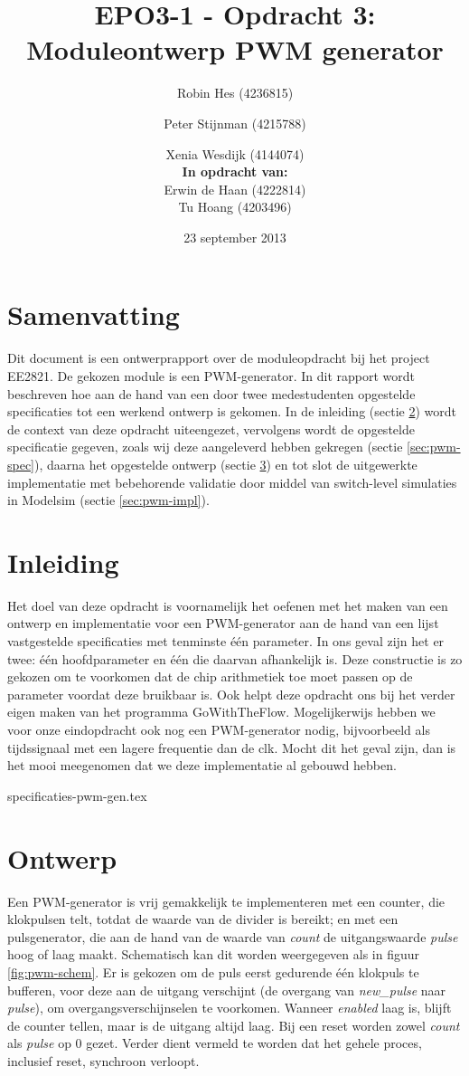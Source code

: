 \documentclass{article}
\author{
Robin Hes (4236815) \and Peter Stijnman (4215788) \and Xenia Wesdijk (4144074) \\

\textbf{In opdracht van:} \\
Erwin de Haan (4222814) \\
Tu Hoang (4203496) \\
}
\title{EPO3-1 - Opdracht 3: Moduleontwerp PWM generator}
\date{23 september 2013}
\begin{document}
\maketitle
\section{Samenvatting}
Dit document is een ontwerprapport over de moduleopdracht bij het project EE2821. De gekozen module is een PWM-generator.
In dit rapport wordt beschreven hoe aan de hand van een door twee medestudenten opgestelde specificaties tot een werkend ontwerp is gekomen.
In de inleiding (sectie \ref{sec:pwm-inl}) wordt de context van deze opdracht uiteengezet, vervolgens wordt de opgestelde specificatie gegeven, zoals wij deze aangeleverd hebben gekregen (sectie \ref{sec:pwm-spec}), daarna het opgestelde ontwerp (sectie \ref{sec:pwm-ontw}) en tot slot de uitgewerkte implementatie met bebehorende validatie door middel van switch-level simulaties in Modelsim (sectie \ref{sec:pwm-impl}).

\tableofcontents

\section{Inleiding}
\label{sec:pwm-inl}
Het doel van deze opdracht is voornamelijk het oefenen met het maken van een ontwerp en implementatie voor een PWM-generator aan de hand van een lijst vastgestelde specificaties met tenminste één parameter. In ons geval zijn het er twee: één hoofdparameter en één die daarvan afhankelijk is. Deze constructie is zo gekozen om te voorkomen dat de chip arithmetiek toe moet passen op de parameter voordat deze bruikbaar is. Ook helpt deze opdracht ons bij het verder eigen maken van het programma GoWithTheFlow.
Mogelijkerwijs hebben we voor onze eindopdracht ook nog een PWM-generator nodig, bijvoorbeeld als tijdssignaal met een lagere frequentie dan de clk. Mocht dit het geval zijn, dan is het mooi meegenomen dat we deze implementatie al gebouwd hebben.

{specificaties-pwm-gen.tex}

\section{Ontwerp}
\label{sec:pwm-ontw}
Een PWM-generator is vrij gemakkelijk te implementeren met een counter, die klokpulsen telt, totdat de waarde van de divider is bereikt; en met een pulsgenerator, die aan de hand van de waarde van \textit{count} de uitgangswaarde \textit{pulse} hoog of laag maakt.
Schematisch kan dit worden weergegeven als in figuur \ref{fig:pwm-schem}. Er is gekozen om de puls eerst gedurende één klokpuls te bufferen, voor deze aan de uitgang verschijnt (de overgang van \textit{new\_pulse} naar \textit{pulse}), om overgangsverschijnselen te voorkomen. Wanneer \textit{enabled} laag is, blijft de counter tellen, maar is de uitgang altijd laag. Bij een reset worden zowel \textit{count} als \textit{pulse} op 0 gezet. Verder dient vermeld te worden dat het gehele proces, inclusief reset, synchroon verloopt.
\end{document}
